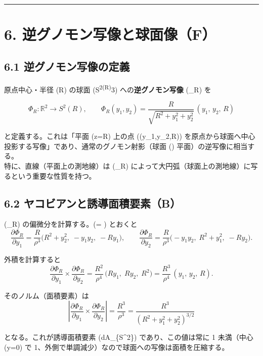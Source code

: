 \documentclass[
  12pt,
  a4paper,
]{article}
\begin{document}
\begin{center}\rule{0.5\linewidth}{0.5pt}\end{center}

\section{6.
逆グノモン写像と球面像（F）}\label{ux9006ux30b0ux30ceux30e2ux30f3ux5199ux50cfux3068ux7403ux9762ux50cff}

\subsection{6.1
逆グノモン写像の定義}\label{ux9006ux30b0ux30ceux30e2ux30f3ux5199ux50cfux306eux5b9aux7fa9}

原点中心・半径 (R) の球面 (S\textsuperscript{2(R)\subset{}}3)
への\textbf{逆グノモン写像} (\Phi\_R) を

\[
\boxed{
\Phi_R:\mathbb{R}^2\to S^2(R),\qquad
\Phi_R(y_1,y_2)
=\frac{R}{\sqrt{R^2+y_1^2+y_2^2}}\,(y_1,\,y_2,\,R)
}
\]

と定義する。これは「平面 (z=R) 上の点 ((y\_1,y\_2,R))
を原点から球面へ中心投影する写像」であり、通常のグノモン射影（球面 (\to)
平面）の逆写像に相当する。\\
特に、直線（平面上の測地線）は (\Phi\_R)
によって大円弧（球面上の測地線）に写るという重要な性質を持つ。

\subsection{6.2
ヤコビアンと誘導面積要素（B）}\label{ux30e4ux30b3ux30d3ux30a2ux30f3ux3068ux8a98ux5c0eux9762ux7a4dux8981ux7d20b}

(\Phi\_R) の偏微分を計算する。(\rho = ) とおくと
\[
\frac{\partial\Phi_R}{\partial y_1}
= \frac{R}{\rho^3}\bigl(R^2+y_2^2,\;-y_1 y_2,\;-R y_1\bigr),
\qquad
\frac{\partial\Phi_R}{\partial y_2}
= \frac{R}{\rho^3}\bigl(-y_1 y_2,\;R^2+y_1^2,\;-R y_2\bigr).
\]

外積を計算すると \[
\frac{\partial\Phi_R}{\partial y_1}\times\frac{\partial\Phi_R}{\partial y_2}
= \frac{R^2}{\rho^4}\,\bigl(R y_1,\;R y_2,\;R^2\bigr)
= \frac{R^3}{\rho^4}\,(y_1,\,y_2,\,R).
\]

そのノルム（面積要素）は \[
\boxed{
\left|\frac{\partial\Phi_R}{\partial y_1}\times\frac{\partial\Phi_R}{\partial y_2}\right|
= \frac{R^3}{\rho^3}
= \frac{R^3}{(R^2+y_1^2+y_2^2)^{3/2}}
}
\]

となる。これが誘導面積要素 (dA\_\{S\^{}2\}) であり、この値は常に 1
未満（中心 (y=0) で
1、外側で単調減少）なので球面への写像は面積を圧縮する。
\end{document}
